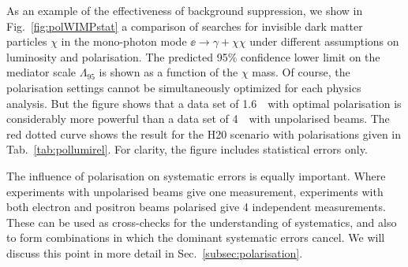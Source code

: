 As an example of the effectiveness of background suppression, we show in Fig.~\ref{fig:polWIMPstat} a comparison of searches  for invisible dark matter particles $\chi$  in the mono-photon  mode $\ee\to \gamma+ \chi\chi$ under different assumptions on luminosity and polarisation.   The predicted 95\% confidence lower limit on the mediator scale $\Lambda_{95}$ is shown as a function of 
the $\chi$ mass.  Of course, the polarisation settings cannot be simultaneously optimized for each physics analysis.  But the figure
shows that a data set of 1.6~\iab\ with optimal polarisation is considerably more powerful than a data set of 4~\iab\ with unpolarised
beams.  The red dotted curve shows the result for the H20 scenario with polarisations given in Tab.~\ref{tab:pollumirel}.   For clarity, the  figure includes statistical errors only. 

The influence of polarisation on systematic errors is equally important.  Where experiments with unpolarised beams give one measurement, experiments with both electron and positron beams polarised give 4 independent measurements.  These can be used as cross-checks for  the understanding of systematics, and also to form combinations in which the 
dominant systematic errors cancel.  We will 
discuss this point in more detail in Sec.~\ref{subsec:polarisation}.